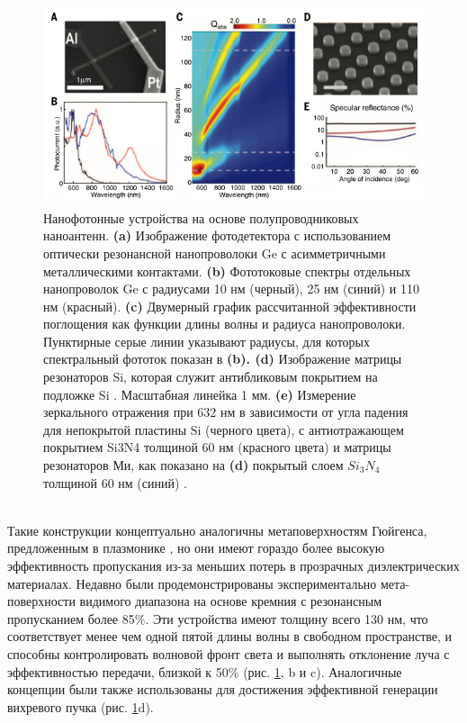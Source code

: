  \begin{figure}[h!]
	\centering
	\includegraphics[width=0.8\linewidth]{images/fig5.png}
	\caption{ Нанофотонные устройства на основе полупроводниковых наноантенн. \textbf{(a)} Изображение фотодетектора с использованием оптически резонансной нанопроволоки Ge с асимметричными металлическими контактами. \textbf{(b)} Фототоковые спектры отдельных нанопроволок Ge с радиусами 10 нм (черный), 25 нм (синий) и 110 нм (красный). \textbf{(c)} Двумерный график рассчитанной эффективности поглощения как функции длины волны и радиуса нанопроволоки. Пунктирные серые линии указывают радиусы, для которых спектральный фототок показан в \textbf{(b). (d)} Изображение матрицы резонаторов Si, которая служит антибликовым покрытием на подложке Si \cite{spinelli2012broadband}. Масштабная линейка 1 мм. \textbf{(e)} Измерение зеркального отражения при 632 нм в зависимости от угла падения для непокрытой пластины Si (черного цвета), с антиотражающем покрытием Si3N4 толщиной 60 нм (красного цвета) и матрицы резонаторов Ми, как показано на \textbf{(d)} покрытый слоем $Si_3N_4$ толщиной 60 нм (синий) \cite{spinelli2012broadband}. }
	\label{nonliner:matasurf1}
\end{figure}
\\
\hspace*{2mm}
Такие конструкции концептуально аналогичны метаповерхностям Гюйгенса, предложенным в плазмонике \cite{pfeiffer2014efficient}, но они имеют гораздо более высокую эффективность пропускания из-за меньших потерь в прозрачных диэлектрических материалах. Недавно были продемонстрированы экспериментально мета-поверхности видимого диапазона на основе кремния с резонансным пропусканием более 85\%. Эти устройства имеют толщину всего 130 нм, что соответствует менее чем одной пятой длины волны в свободном пространстве, и способны контролировать волновой фронт света и выполнять отклонение луча с эффективностью передачи, близкой к 50\% (рис. \ref{nonliner:matasurf1}, b и c). Аналогичные концепции были также использованы для достижения эффективной генерации вихревого пучка (рис. \ref{nonliner:matasurf1}d). 
